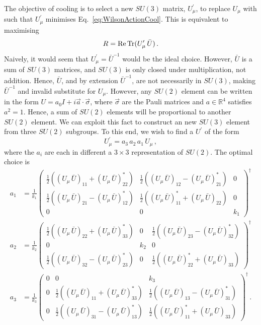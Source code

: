 The objective of cooling is to select a new $SU(3)$ matrix, $U_\mu^\prime$, to replace $U_\mu$ with such that $U_\mu^\prime$ minimises Eq.~\ref{eq:WilsonActionCool}. This is equivalent to maximising
%
\begin{equation}
R = \operatorname{Re} \operatorname{Tr} (U_\mu^\prime \, \bar{U})\, .
\label{eq:CoolFunctional}
\end{equation}
%
Naively, it would seem that $U_\mu^\prime = \bar{U}^{-1}$ would be the ideal choice. However, $\bar{U}$ is a sum of $SU(3)$ matrices, and $SU(3)$ is only closed under multiplication, not addition. Hence, $\bar{U}$, and by extension $\bar{U}^{-1}$, are not necessarily in $SU(3)$, making $\bar{U}^{-1}$ and invalid substitute for $U_\mu$. However, any $SU(2)$ element can be written in the form $U = a _ { 0 } I + i \vec { a } \cdot \vec { \sigma }$, where $\vec{\sigma}$ are the Pauli matrices and $a\in\mathbb{R}^4$  satisfies $a^2=1$. Hence, a sum of $SU(2)$ elements will be proportional to another $SU(2)$ element. We can exploit this fact to construct an new $SU(3)$ element from three $SU(2)$ subgroups. To this end, we wish to find a $U^\prime$ of the form
%
\begin{equation}
U^\prime_\mu = a_3\,a_2\,a_1\,U_\mu\, ,
\label{eq:UPrime}
\end{equation}
%
where the $a_i$ are each in different a $3\times 3$ representation of $SU(2)$. The optimal choice is
%
\begin{align*}
a_1 &= \frac{1}{k_1}
\begin{pmatrix}
\frac{1}{2}\left((U_\mu \, \bar{U})_{11} + (U_\mu \, \bar{U})^*_{22}\right) & \frac{1}{2}\left((U_\mu \, \bar{U})_{12} - (U_\mu \, \bar{U})^*_{21}\right) & 0\\
\frac{1}{2}\left((U_\mu \, \bar{U})_{21} - (U_\mu \, \bar{U})^*_{12}\right) & \frac{1}{2}\left((U_\mu \, \bar{U})^*_{11} + (U_\mu \, \bar{U})_{22}\right) & 0\\
0 & 0 & k_1
\end{pmatrix}^\dagger\\
a_2 &= \frac{1}{k_2}
\begin{pmatrix}
\frac{1}{2}\left((U_\mu \, \bar{U})_{22} + (U_\mu \, \bar{U})^*_{33}\right) & 0 & \frac{1}{2}\left((U_\mu \, \bar{U})_{23} - (U_\mu \, \bar{U})^*_{32}\right)\\
0 & k_2 & 0\\
\frac{1}{2}\left((U_\mu \, \bar{U})_{32} - (U_\mu \, \bar{U})^*_{23}\right) & 0 & \frac{1}{2}\left((U_\mu \, \bar{U})^*_{22} + (U_\mu \, \bar{U})_{33}\right)
\end{pmatrix}^\dagger\\
a_3 &= \frac{1}{k_3}
\begin{pmatrix}
0 & 0 & k_3\\
0 & \frac{1}{2}\left((U_\mu \, \bar{U})_{11} + (U_\mu \, \bar{U})^*_{33}\right) & \frac{1}{2}\left((U_\mu \, \bar{U})_{13} - (U_\mu \, \bar{U})^*_{31}\right)\\
0 & \frac{1}{2}\left((U_\mu \, \bar{U})_{31} - (U_\mu \, \bar{U})^*_{13}\right) & \frac{1}{2}\left((U_\mu \, \bar{U})^*_{11} + (U_\mu \, \bar{U})_{33}\right)
\end{pmatrix}^\dagger\, .
\end{align*}
